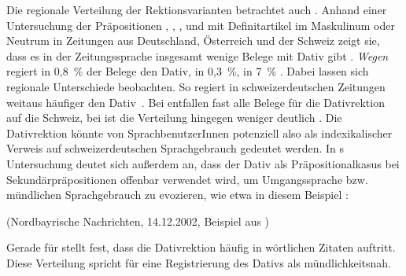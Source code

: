 Die regionale Verteilung der Rektionsvarianten betrachtet auch \citet{Elter2005}. 
Anhand einer Untersuchung der Pr{\"a}positionen \wegen, \waehrend, \dank,  und  mit Definitartikel im Maskulinum oder Neutrum in Zeitungen aus Deutschland, Österreich und der Schweiz zeigt sie, dass es in der Zeitungssprache insgesamt wenige Belege mit Dativ gibt \citep[s.][128]{Elter2005}. 
\textit{Wegen} regiert in 0,8~\% der Belege den Dativ, \waehrend{} in 0,3~\%, \dank{} in 7~\% \citep[s.][128]{Elter2005}. 
Dabei lassen sich regionale Unterschiede beobachten. 
So regiert \dank{} in schweizerdeutschen Zeitungen weitaus h{\"a}ufiger den Dativ~\citep[s.][134]{Elter2005}. 
Bei \waehrend{} entfallen fast alle Belege für die Dativrektion auf die Schweiz, bei \wegen{} ist die Verteilung hingegen weniger deutlich \citep[s.][130--131]{Elter2005}.
Die Dativrektion könnte von SprachbenutzerInnen potenziell also als indexikalischer Verweis auf schweizerdeutschen Sprachgebrauch gedeutet werden. 
In \citeauthor{Elter2005}s Untersuchung deutet sich außerdem an, dass der Dativ als Pr{\"a}positionalkasus bei Sekund{\"a}rpr{\"a}positionen offenbar verwendet wird, um Umgangssprache bzw. m{\"u}ndlichen Sprachgebrauch zu evozieren, wie etwa in diesem Beispiel \citep[s.][128--129]{Elter2005}:
\begin{exe}
\ex {} (Nordbayrische Nachrichten, 14.12.2002, Beispiel aus \citealp[129]{Elter2005})
\end{exe}
Gerade für \wegen{} stellt \citet[128]{Elter2005} fest, dass die Dativrektion häufig in wörtlichen Zitaten auftritt. 
Diese Verteilung spricht für eine Registrierung des Dativs als mündlichkeitsnah.

